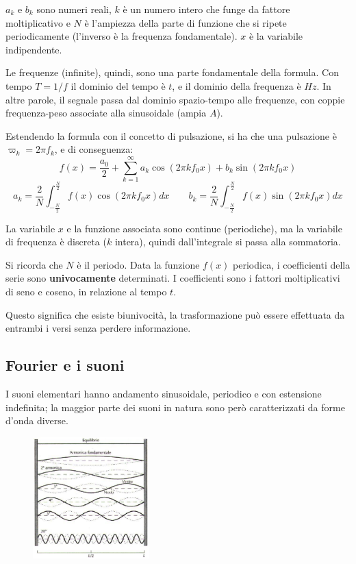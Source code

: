 $a_k$ e $b_k$ sono numeri reali, $k$ è un numero intero che funge da fattore moltiplicativo e $N$ è l'ampiezza della parte di funzione che si ripete periodicamente (l'inverso è la frequenza fondamentale). $x$ è la variabile indipendente.

Le frequenze (infinite), quindi, sono una parte fondamentale della formula. Con tempo $T = 1/f$ il dominio del tempo è $t$, e il dominio della frequenza è $Hz$. In altre parole, il segnale passa dal dominio spazio-tempo alle frequenze, con coppie frequenza-peso associate alla sinusoidale (ampia $A$).

Estendendo la formula con il concetto di pulsazione, si ha che una pulsazione è $\varpi_k = 2\pi f_k$, e di conseguenza:
$$f(x) = \frac{a_0}{2} + \sum_{k=1}^{\infty} a_k \cos(2\pi kf_0x) + b_k\sin(2\pi kf_0x)$$
$$a_k = \frac{2}{N} \int_{-\frac{N}{2}}^{\frac{N}{2}} f(x)\cos(2\pi kf_0x) dx \qquad b_k = \frac{2}{N} \int_{-\frac{N}{2}}^{\frac{N}{2}} f(x)\sin(2\pi kf_0x) dx$$

La variabile $x$ e la funzione associata sono continue (periodiche), ma la variabile di frequenza è discreta ($k$ intera), quindi dall'integrale si passa alla sommatoria.

Si ricorda che $N$ è il periodo. Data la funzione $f(x)$ periodica, i coefficienti della serie sono \textbf{univocamente} determinati. I coefficienti sono i fattori moltiplicativi di seno e coseno, in relazione al tempo $t$.

Questo significa che esiste biunivocità, la trasformazione può essere effettuata da entrambi i versi senza perdere informazione.

\subsection{Fourier e i suoni}
I suoni elementari hanno andamento sinusoidale, periodico e con estensione indefinita; la maggior parte dei suoni in natura sono però caratterizzati da forme d'onda diverse.

\begin{figure}
	\vspace{-15pt}
	\begin{center}
		\includegraphics[width=0.4\textwidth]{Lezioni/Immagini/armoniche}
	\end{center}
	\vspace{-50pt}
\end{figure}

